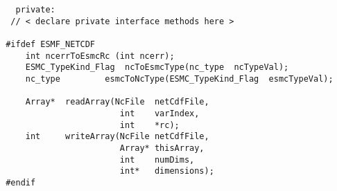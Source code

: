 \begin{verbatim}   private:
  // < declare private interface methods here >
 
 #ifdef ESMF_NETCDF
     int ncerrToEsmcRc (int ncerr);
     ESMC_TypeKind_Flag  ncToEsmcType(nc_type  ncTypeVal);
     nc_type         esmcToNcType(ESMC_TypeKind_Flag  esmcTypeVal);
 
     Array*  readArray(NcFile  netCdfFile,
                        int    varIndex,
                        int    *rc);
     int     writeArray(NcFile netCdfFile,
                        Array* thisArray,
                        int    numDims,
                        int*   dimensions);
 #endif
 \end{verbatim}

\setlength{\parskip}{\oldparskip}
\setlength{\parindent}{\oldparindent}
\setlength{\baselineskip}{\oldbaselineskip}
